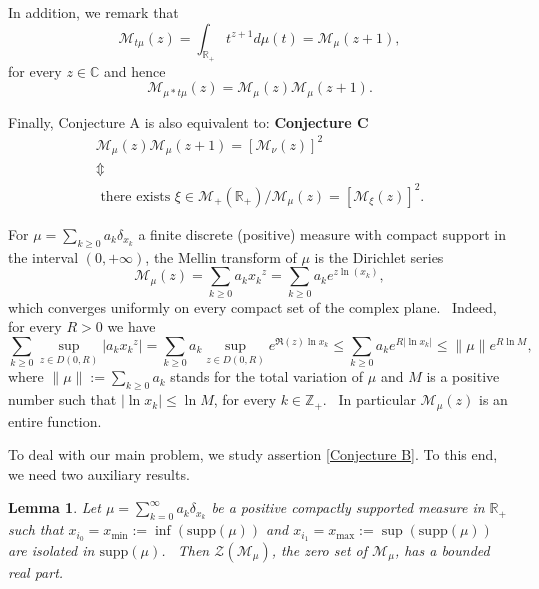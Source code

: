 \documentclass[12pt]{amsart}
\newtheorem{lem}[thm]{Lemma}
\newcommand{\C}{\mathbb{C}}
\newcommand{\Z}{\mathbb{Z}}
\begin{document}
 In addition, we remark that  $$
\mathcal{M}_{t\mu}(z)=\int_{\mathbb{R}_+} t^{z+1} d\mu(t)=\mathcal{M}_{\mu}(z+1),
$$
 for every $z\in\C$ and hence 
$$
\mathcal{M}_{\mu*t\mu}(z)=\mathcal{M}_{\mu}(z)\mathcal{M}_{\mu}(z+1).
$$

Finally, Conjecture A is also equivalent to: \newline
\vspace{4pt} {\bf Conjecture C} \\
\begin{equation} \label{Conjecture C}
\begin{array}{c}
    \mathcal{M}_{\mu}(z)\mathcal{M}_{\mu}(z+1)=[\mathcal{M}_{\nu}(z)]^2 \\
    \Updownarrow\\
    \textrm{ there exists } \xi \in \mathcal{M}_+(\mathbb{R}_+) / \mathcal{M}_{\mu}(z)=[\mathcal{M}_{\xi}(z)]^2. 
\end{array}  
\end{equation}

For $\mu=\sum_{k\ge0}  a_k\delta_{x_k}$ a finite discrete (positive) measure  with compact support in the interval $(0,+\infty)$,  the Mellin transform of $\mu$ is the Dirichlet series
\begin{equation}
    \mathcal{M}_\mu(z)=\sum_{k\ge 0}  a_k{x_k}^z=\sum_{k\ge 0}  a_ke^{z\ln(x_k)}, \label{Mellin}
\end{equation}
which converges uniformly on every compact set of the complex plane. \ Indeed, for every $R>0$ we have
$$
\sum_{k\ge 0} \sup_{z\in D(0,R)}|a_k{x_k}^z|=\sum_{k\ge 0} a_k \sup_{z\in D(0,R)}e^{\Re(z)\ln{x_k}}\le \sum_{k\ge 0} a_k e^{R|\ln{x_k}|}\leq \|\mu\|e^{R\ln{M}},
$$
where $\|\mu\|:=\sum_{k\ge 0} a_k $ stands for the total variation of $\mu$ and $M$ is a positive number such that $|\ln x_k| \leq \ln M$, for every  $k\in\Z_+$. \ In particular $\mathcal{M}_\mu(z)$ is an entire function.

To deal with our main problem, we study assertion \eqref{Conjecture B}. To this end, we need two auxiliary results.
\begin{lem}\label{lem22} Let $\mu=\sum_{k=0}^\infty a_k\delta_{x_k}$ be a positive compactly supported measure in ${\mathbb R}_+$ such that $x_{i_0}=x_{\textrm{min}}:=\inf(\mathrm{supp}(\mu))$ and $x_{i_1}=x_{\textrm{max}}:=\sup(\mathrm{supp}(\mu))$ are isolated in $ \mathrm{supp}(\mu)$. \ Then 
$\mathcal{Z}(\mathcal{M}_{\mu})$, the zero set of $\mathcal{M}_\mu$,  has a bounded real part.
\end{lem} 
\end{document}
